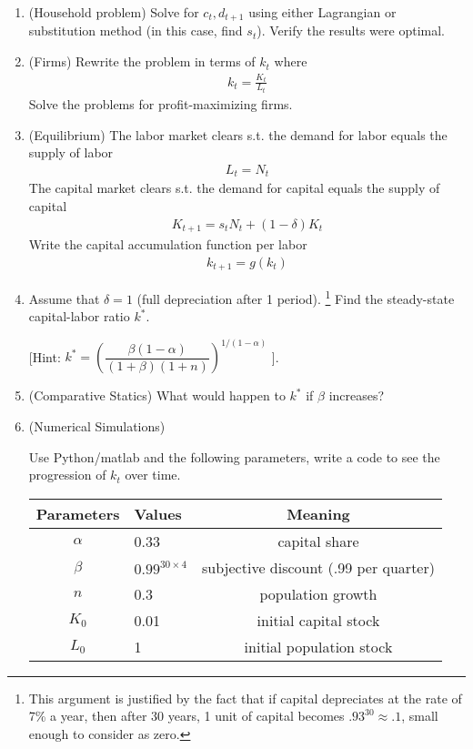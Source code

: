 \documentclass[10pt,a4paper]{book}
\theoremstyle{definition}\newtheorem{definition}{Definition}
\theoremstyle{definition}\newtheorem{fact}{Fact}
\theoremstyle{definition}\newtheorem{ex}{Ex.}
\theoremstyle{definition}\newtheorem{project}{Project}
\theoremstyle{definition}\newtheorem{problem}{Problem}
\theoremstyle{definition}\newtheorem{example}{Example}
\numberwithin{theorem}{chapter}
\numberwithin{corollary}{chapter}
\numberwithin{assumption}{chapter}
\numberwithin{definition}{chapter}
\numberwithin{prop}{chapter}
\numberwithin{notation}{chapter}
\numberwithin{problem}{chapter}
\numberwithin{example}{chapter}
\numberwithin{fact}{chapter}
\numberwithin{ex}{chapter}
\begin{document}
	\begin{enumerate}
		\item (Household problem) Solve for $c_t, d_{t+1}$ using either Lagrangian or substitution method (in this case, find $s_t$). Verify the results were optimal.
		\item (Firms) Rewrite the problem in terms of $k_t$ where
		\begin{align*}
			k_t = \frac{K_t}{L_t} 
		\end{align*} 
		Solve the problems for profit-maximizing firms.
		\item (Equilibrium) The labor market clears s.t. the demand for labor equals the supply of labor
		\begin{align*}
			L_t = N_t 
		\end{align*}
		The capital market clears s.t. the demand for capital equals the supply of capital
		\begin{align*}
			K_{t+1} = s_t N_t + (1-\delta) K_t
		\end{align*}
		Write the capital accumulation function per labor
		\begin{align*}
			k_{t+1} = g(k_t) 
		\end{align*}
		\item Assume that $\delta = 1$ (full depreciation after 1 period). \footnote{This argument is justified by the fact that if capital depreciates at the rate of 7\% a year, then after 30 years, 1 unit of capital becomes $.93^{30} \approx .1$, small enough to consider as zero.}
		Find the steady-state capital-labor ratio $k^*$.
		
		[Hint: $k^* = \left( \dfrac{\beta (1-\alpha)}{(1+\beta)(1+n)} \right)^{1/(1-\alpha)}$  ].
		
		\item (Comparative Statics) What would happen to $k^*$ if $\beta$ increases? 

	
	
	\item (Numerical Simulations)
	
	Use Python/matlab and the following parameters, write a code to see the progression of $k_t$ over time.
	
	\begin{table}[H]
		\centering
		\begin{tabular}{c | l | c}
			Parameters & Values              & Meaning                               \\
			\hline 
			$\alpha$   & 0.33                & capital share                         \\
			$\beta$    & $0.99^{30\times 4}$ & subjective discount (.99 per quarter) \\
			$n$        & 0.3                 & population growth                     \\
			\hline
			$K_0$      & 0.01                & initial capital stock                 \\
			$L_0$      & 1                   & initial population stock              
		\end{tabular}
	\end{table}
	\end{enumerate}
		
\end{document}
